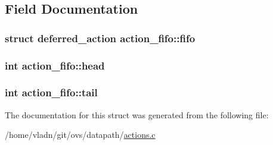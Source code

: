 \subsection{Field Documentation}
\hypertarget{structaction__fifo_ab25b47c1bc05f5417f0a2073a47b2eb5}{}
\subsubsection[{fifo}]{\setlength{\rightskip}{0pt plus 5cm}struct {\bf deferred\+\_\+action} action\+\_\+fifo\+::fifo}\label{structaction__fifo_ab25b47c1bc05f5417f0a2073a47b2eb5}
\hypertarget{structaction__fifo_a5376b4a5c9dbfd84303d156a47ed9018}{}
\subsubsection[{head}]{\setlength{\rightskip}{0pt plus 5cm}int action\+\_\+fifo\+::head}\label{structaction__fifo_a5376b4a5c9dbfd84303d156a47ed9018}
\hypertarget{structaction__fifo_a60805cbdf935d6718f685c7374ae9493}{}
\subsubsection[{tail}]{\setlength{\rightskip}{0pt plus 5cm}int action\+\_\+fifo\+::tail}\label{structaction__fifo_a60805cbdf935d6718f685c7374ae9493}


The documentation for this struct was generated from the following file\+:\begin{DoxyCompactItemize}
\item 
/home/vladn/git/ovs/datapath/\hyperlink{actions_8c}{actions.\+c}\end{DoxyCompactItemize}
